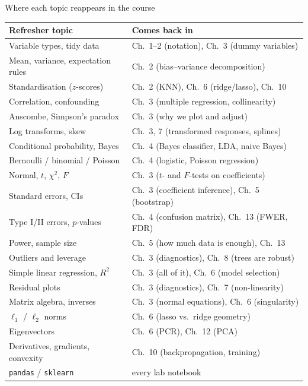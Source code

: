 \documentclass[aspectratio=169,11pt]{beamer}
\begin{document}
\begin{frame}{Where each topic reappears in the course}
  \tiny
  \begin{center}
  \begin{tabular}{@{}ll@{}}
    \toprule
    \textbf{Refresher topic} & \textbf{Comes back in} \\
    \midrule
    Variable types, tidy data & Ch.\ 1--2 (notation), Ch.\ 3 (dummy variables) \\
    Mean, variance, expectation rules & Ch.\ 2 (bias--variance decomposition) \\
    Standardisation ($z$-scores) & Ch.\ 2 (KNN), Ch.\ 6 (ridge/lasso), Ch.\ 10 \\
    Correlation, confounding & Ch.\ 3 (multiple regression, collinearity) \\
    Anscombe, Simpson's paradox & Ch.\ 3 (why we plot and adjust) \\
    Log transforms, skew & Ch.\ 3, 7 (transformed responses, splines) \\
    Conditional probability, Bayes & Ch.\ 4 (Bayes classifier, LDA, naive Bayes) \\
    Bernoulli / binomial / Poisson & Ch.\ 4 (logistic, Poisson regression) \\
    Normal, $t$, $\chi^2$, $F$ & Ch.\ 3 ($t$- and $F$-tests on coefficients) \\
    Standard errors, CIs & Ch.\ 3 (coefficient inference), Ch.\ 5 (bootstrap) \\
    Type I/II errors, $p$-values & Ch.\ 4 (confusion matrix), Ch.\ 13 (FWER, FDR) \\
    Power, sample size & Ch.\ 5 (how much data is enough), Ch.\ 13 \\
    Outliers and leverage & Ch.\ 3 (diagnostics), Ch.\ 8 (trees are robust) \\
    Simple linear regression, $R^2$ & Ch.\ 3 (all of it), Ch.\ 6 (model selection) \\
    Residual plots & Ch.\ 3 (diagnostics), Ch.\ 7 (non-linearity) \\
    Matrix algebra, inverses & Ch.\ 3 (normal equations), Ch.\ 6 (singularity) \\
    $\ell_1$ / $\ell_2$ norms & Ch.\ 6 (lasso vs.\ ridge geometry) \\
    Eigenvectors & Ch.\ 6 (PCR), Ch.\ 12 (PCA) \\
    Derivatives, gradients, convexity & Ch.\ 10 (backpropagation, training) \\
    \texttt{pandas} / \texttt{sklearn} & every lab notebook \\
    \bottomrule
  \end{tabular}
  \end{center}
\end{frame}
\end{document}
